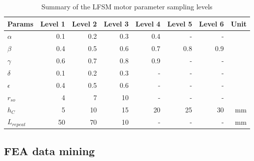             
            \begin{table}
                \renewcommand{\arraystretch}{1.2}
                \caption{Summary of the \acs{LFSM} motor parameter sampling levels}
                \label{table:chap/rsm/LFSM/sampling levels}
                \centering
                \begin{tabular}{@{}l r r r r r r r@{}}
                \hline
                \bfseries Params & \bfseries Level 1 & \bfseries Level 2 & \bfseries Level 3 & \bfseries Level 4 & \bfseries Level 5 & \bfseries Level 6 & \bfseries Unit \\
                \hline
                    $\alpha$     & 0.1     & 0.2  & 0.3 & 0.4 & -   & -   &               \\
                    $\beta$      & 0.4     & 0.5  & 0.6 & 0.7 & 0.8 & 0.9 &               \\
                    $\gamma$     & 0.6     & 0.7  & 0.8 & 0.9 & -   & -   &               \\
                    $\delta$     & 0.1     & 0.2  & 0.3 & -   & -   & -   &               \\
                    $\epsilon$   & 0.4     & 0.5  & 0.6 & -   & -   & -   &               \\
                    $r_{so}$     & 4       & 7    & 10  & -   & -   & -   &               \\
                    $h_C$        & 5       & 10   & 15  & 20  & 25  & 30  & $\mathrm{mm}$ \\
                    $L_{repeat}$ & 50      & 70   & 10  & -   & -   & -   & $\mathrm{mm}$
                    \\
                \hline
                \end{tabular}
            \end{table}
                    
        
        \subsection{\acs{FEA} data mining}          \label{Chapter:RSM/LFSM/data mining}
        
